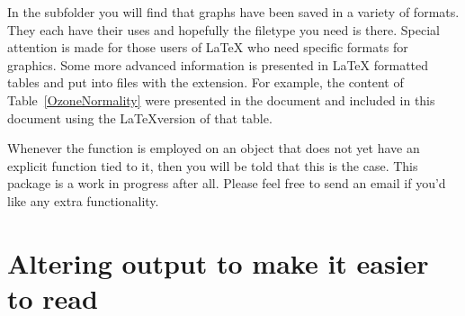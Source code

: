 In the  subfolder you will find that graphs have been saved in a variety of formats. They each have their uses and hopefully the filetype you need is there. Special attention is made for those users of \LaTeX{} who need specific formats for graphics. Some more advanced information is presented in \LaTeX{} formatted tables and put into files with the  extension. For example, the content of Table~\ref{OzoneNormality} were presented in the  document and included in this document using the \LaTeX{}version of that table. 
 
 
 
Whenever the  function is employed on an object that does not yet have an explicit function tied to it, then you will be told that this is the case. This package is a work in progress after all. Please feel free to send an email if you'd like any extra functionality. 
 
 
 
\section{Altering \R{} output to make it easier to read} 
 
